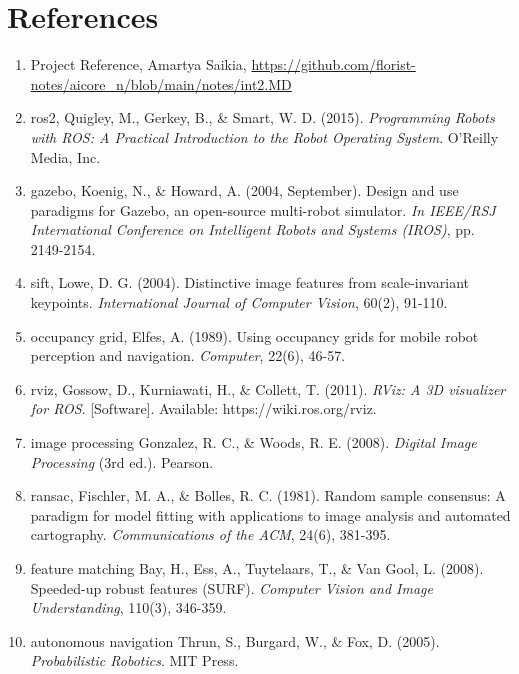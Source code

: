 \documentclass{josis}
\begin{document}
\section{References}
\begin{enumerate}
    \item Project Reference, Amartya Saikia, \url{https://github.com/florist-notes/aicore_n/blob/main/notes/int2.MD}\\
    \item ros2, Quigley, M., Gerkey, B., \& Smart, W. D. (2015). \textit{Programming Robots with ROS: A Practical Introduction to the Robot Operating System}. O'Reilly Media, Inc.\\
    \item gazebo,
Koenig, N., \& Howard, A. (2004, September). Design and use paradigms for Gazebo, an open-source multi-robot simulator. \textit{In IEEE/RSJ International Conference on Intelligent Robots and Systems (IROS)}, pp. 2149-2154.\\
\item sift,
Lowe, D. G. (2004). Distinctive image features from scale-invariant keypoints. \textit{International Journal of Computer Vision}, 60(2), 91-110.\\
\item occupancy grid,
Elfes, A. (1989). Using occupancy grids for mobile robot perception and navigation. \textit{Computer}, 22(6), 46-57.\\
\item rviz,
Gossow, D., Kurniawati, H., \& Collett, T. (2011). \textit{RViz: A 3D visualizer for ROS}. [Software]. Available: https://wiki.ros.org/rviz.\\
\item image processing
Gonzalez, R. C., \& Woods, R. E. (2008). \textit{Digital Image Processing} (3rd ed.). Pearson.\\
\item ransac,
Fischler, M. A., \& Bolles, R. C. (1981). Random sample consensus: A paradigm for model fitting with applications to image analysis and automated cartography. \textit{Communications of the ACM}, 24(6), 381-395.\\
\item feature matching
Bay, H., Ess, A., Tuytelaars, T., \& Van Gool, L. (2008). Speeded-up robust features (SURF). \textit{Computer Vision and Image Understanding}, 110(3), 346-359.\\
\item autonomous navigation
Thrun, S., Burgard, W., \& Fox, D. (2005). \textit{Probabilistic Robotics}. MIT Press.



\end{enumerate}
\end{document}
